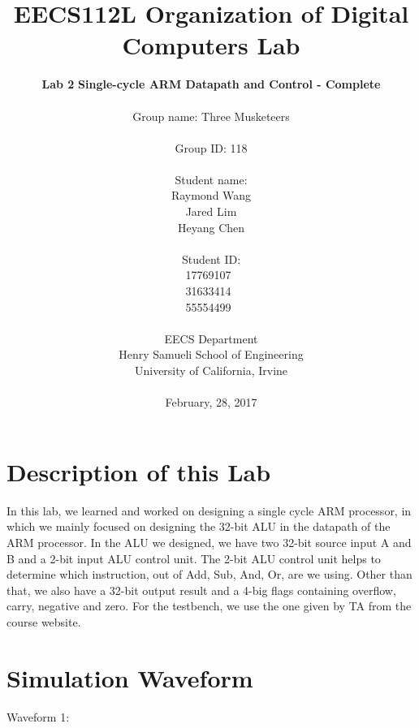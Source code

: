 \documentclass{article}
\begin{document}
\title{EECS112L Organization of Digital Computers Lab}
\author{\textbf{Lab 2} \textbf{Single-cycle ARM Datapath and Control - Complete} \\ \\
Group name: Three Musketeers \\ \\ Group ID: 118 \\ \\ Student name: \\ Raymond Wang \\ Jared Lim\\ Heyang Chen \\ \\ Student ID: \\17769107~\\31633414~\\55554499~\\ \\ 
EECS Department\\ Henry Samueli School of Engineering \\ University of California, Irvine \\ \\
{February, 28, 2017}} 


\date{}
\maketitle

\newpage

\section{Description of this Lab}

In this lab, we learned and worked on designing a single cycle ARM processor, in which we mainly focused on designing the 32-bit ALU in the datapath of the ARM processor. In the ALU we designed, we have two 32-bit source input A and B and a 2-bit input ALU control unit. The 2-bit ALU control unit helps to determine which instruction, out of Add, Sub, And, Or, are we using. Other than that, we also have a 32-bit output result and a 4-big flags containing overflow, carry, negative and zero. For the testbench, we use the one given by TA from the course website.

\section{Simulation Waveform}
Waveform 1:
\newline
\newline
\end{document}
